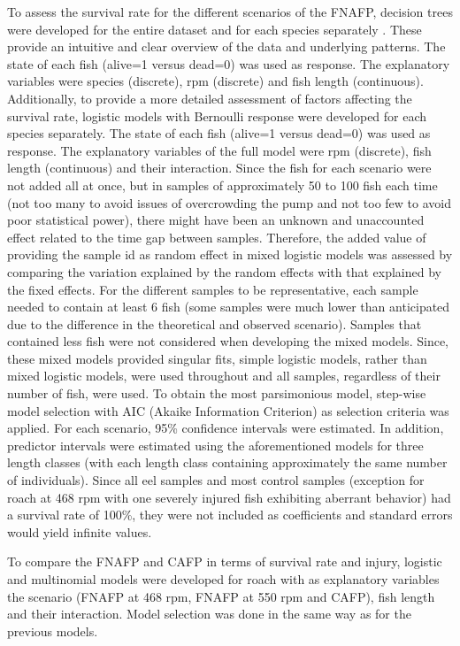 \documentclass[fleqn,10pt]{wlscirep}
\begin{document}
To assess the survival rate for the different scenarios of the FNAFP, decision trees were developed for the entire dataset and for each species separately \cite{Breiman2017ClassificationTrees}. These provide an intuitive and clear overview of the data and underlying patterns. The state of each fish (alive=1 versus dead=0) was used as response. The explanatory variables were species (discrete), rpm (discrete) and fish length (continuous).
Additionally, to provide a more detailed assessment of factors affecting the survival rate, logistic models with Bernoulli response were developed for each species separately. The state of each fish (alive=1 versus dead=0) was used as response. The explanatory variables of the full model were rpm (discrete), fish length (continuous) and their interaction. Since the fish for each scenario were not added all at once, but in samples of approximately 50 to 100 fish each time (not too many to avoid issues of overcrowding the pump and not too few to avoid poor statistical power), there might have been an unknown and unaccounted effect related to the time gap between samples. Therefore, the added value of providing the sample id as random effect in mixed logistic models was assessed by comparing the variation explained by the random effects with that explained by the fixed effects. For the different samples to be representative, each sample needed to contain at least 6 fish (some samples were much lower than anticipated due to the difference in the theoretical and observed scenario). Samples that contained less fish were not considered when developing the mixed models. Since, these mixed models provided singular fits, simple logistic models, rather than mixed logistic models, were used throughout and all samples, regardless of their number of fish, were used. 
To obtain the most parsimonious model, step-wise model selection with AIC (Akaike Information Criterion) as selection criteria was applied. For each scenario, 95\% confidence intervals were estimated. In addition, predictor intervals were estimated using the aforementioned models for three length classes (with each length class containing approximately the same number of individuals). Since all eel samples and most control samples (exception for roach at 468 rpm with one severely injured fish exhibiting aberrant behavior) had a survival rate of 100\%, they were not included as coefficients and standard errors would yield infinite values. 

To compare the FNAFP and CAFP in terms of survival rate and injury, logistic and multinomial models were developed for roach with as explanatory variables the scenario (FNAFP at 468 rpm, FNAFP at 550 rpm and CAFP), fish length and their interaction. Model selection was done in the same way as for the previous models. 
\end{document}

